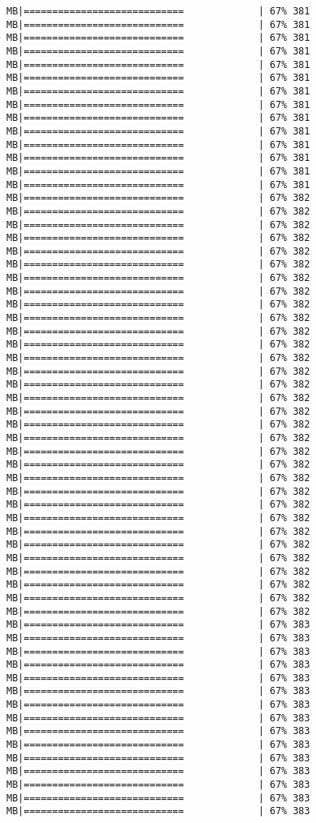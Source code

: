 \documentclass[
]{article}
\begin{document}
\begin{verbatim}
MB|============================             | 67% 381 MB|============================             | 67% 381 MB|============================             | 67% 381 MB|============================             | 67% 381 MB|============================             | 67% 381 MB|============================             | 67% 381 MB|============================             | 67% 381 MB|============================             | 67% 381 MB|============================             | 67% 381 MB|============================             | 67% 381 MB|============================             | 67% 381 MB|============================             | 67% 381 MB|============================             | 67% 381 MB|============================             | 67% 381 MB|============================             | 67% 382 MB|============================             | 67% 382 MB|============================             | 67% 382 MB|============================             | 67% 382 MB|============================             | 67% 382 MB|============================             | 67% 382 MB|============================             | 67% 382 MB|============================             | 67% 382 MB|============================             | 67% 382 MB|============================             | 67% 382 MB|============================             | 67% 382 MB|============================             | 67% 382 MB|============================             | 67% 382 MB|============================             | 67% 382 MB|============================             | 67% 382 MB|============================             | 67% 382 MB|============================             | 67% 382 MB|============================             | 67% 382 MB|============================             | 67% 382 MB|============================             | 67% 382 MB|============================             | 67% 382 MB|============================             | 67% 382 MB|============================             | 67% 382 MB|============================             | 67% 382 MB|============================             | 67% 382 MB|============================             | 67% 382 MB|============================             | 67% 382 MB|============================             | 67% 382 MB|============================             | 67% 382 MB|============================             | 67% 382 MB|============================             | 67% 382 MB|============================             | 67% 382 MB|============================             | 67% 383 MB|============================             | 67% 383 MB|============================             | 67% 383 MB|============================             | 67% 383 MB|============================             | 67% 383 MB|============================             | 67% 383 MB|============================             | 67% 383 MB|============================             | 67% 383 MB|============================             | 67% 383 MB|============================             | 67% 383 MB|============================             | 67% 383 MB|============================             | 67% 383 MB|============================             | 67% 383 MB|============================             | 67% 383 MB|============================             | 67% 383 
\end{verbatim}
\end{document}
